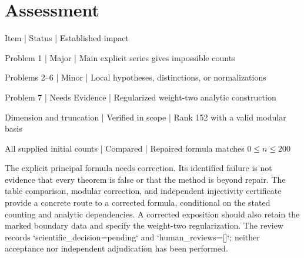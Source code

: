 \documentclass[10pt]{article}
\begin{document}
\section*{Assessment}
Item | Status | Established impact\par
Problem 1 | Major | Main explicit series gives impossible counts\par
Problems 2–6 | Minor | Local hypotheses, distinctions, or normalizations\par
Problem 7 | Needs Evidence | Regularized weight-two analytic construction\par
Dimension and truncation | Verified in scope | Rank 152 with a valid modular basis\par
All supplied initial counts | Compared | Repaired formula matches \(0\le n\le200\)\par
The explicit principal formula needs correction. Its identified failure is not evidence that every theorem is false or that the method is beyond repair. The table comparison, modular correction, and independent injectivity certificate provide a concrete route to a corrected formula, conditional on the stated counting and analytic dependencies. A corrected exposition should also retain the marked boundary data and specify the weight-two regularization. The review records `scientific\_decision=pending` and `human\_reviews=[]`; neither acceptance nor independent adjudication has been performed.\par
\end{document}

